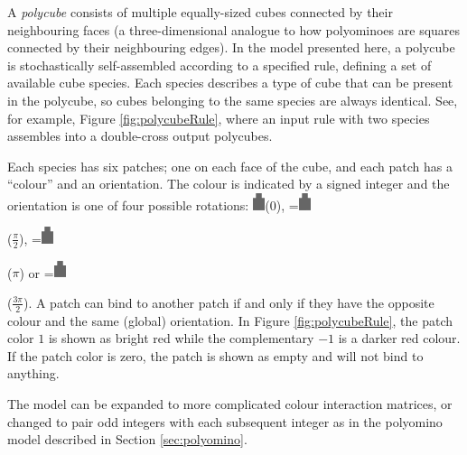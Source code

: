 A \emph{polycube} consists of multiple equally-sized cubes connected by their neighbouring faces (a three-dimensional analogue to how polyominoes are squares connected by their neighbouring edges). In the model presented here, a polycube is stochastically self-assembled according to a specified rule, defining a set of available cube species. Each species describes a type of cube that can be present in the polycube, so cubes belonging to the same species are always identical. See, for example, Figure \ref{fig:polycubeRule}, where an input rule with two species assembles into a double-cross output polycubes.

Each species has six patches; one on each face of the cube, and each patch has a ``colour'' and an orientation. The colour is indicated by a signed integer and the orientation is one of four possible rotations: \includegraphics[width=10pt]{figures/face.eps}\hspace{4pt}(\(0\)),
\begingroup{}=\hbox{\includegraphics[width=10pt,angle=-90]{figures/face.eps}}\parbox{\wd0}{}\endgroup\hspace{4pt}(\(\frac{\pi}{2}\)),
\begingroup{}=\hbox{\includegraphics[width=10pt,angle=180]{figures/face.eps}}\parbox{\wd0}{}\endgroup\hspace{4pt}(\(\pi\)) or
\begingroup{}=\hbox{\includegraphics[width=10pt,angle=90]{figures/face.eps}}\parbox{\wd0}{}\endgroup\hspace{4pt}(\(\frac{3\pi}{2}\)). A patch can bind to another patch if and only if they have the opposite colour and the same (global) orientation. In Figure \ref{fig:polycubeRule}, the patch color \(1\) is shown as bright red while the complementary \(-1\) is a darker red colour.  If the patch color is zero, the patch is shown as empty and will not bind to anything.

The model can be expanded to more complicated colour interaction matrices, or changed to pair odd integers with each subsequent integer as in the polyomino model\cite{ahnert2010self,johnston2011evolutionary} described in Section \ref{sec:polyomino}.

